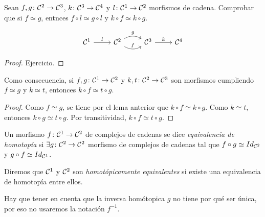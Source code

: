 \documentclass[HS.tex]{subfiles}
\begin{document}
\begin{lemma}
Sean $f,g \colon \mathcal{C}^2 \to \mathcal{C}^3$, $k \colon \mathcal{C}^3 \to \mathcal{C}^4$ y $l \colon \mathcal{C}^1 \to \mathcal{C}^2$ morfismos de cadena. Comprobar que si $f \simeq g$, entnces $f \circ l \simeq g \circ l$ y $k \circ f \simeq k \circ g$.

\[
\begin{tikzcd}
\CC^1 \arrow[r,"l"] & \CC^2 \arrow[r,bend right,"f"] \arrow[r,bend left,"g"]& \CC^3 \arrow[r,"k"] & \CC^4
\end{tikzcd}
\]
\end{lemma}
\begin{proof}
Ejercicio.
\end{proof}

\begin{coro}
Como consecuencia, si $f, g \colon \mathcal{C}^1 \to \mathcal{C}^2$ y $k,t \colon \mathcal{C}^2 \to \mathcal{C}^3$ son morfismos cumpliendo $f \simeq g$ y $k \simeq t$, entonces $k \circ f \simeq t \circ g$.
\end{coro}
\begin{proof}
Como $f \simeq g$, se tiene por el lema anterior que $k \circ f \simeq k \circ g$.
Como $k \simeq t$, entonces $k \circ g \simeq t \circ g$.
Por transitividad, $k \circ f \simeq t \circ g$.
\end{proof}

\begin{defi}
Un morfismo $f \colon \mathcal{C}^1 \to \mathcal{C}^2$ de complejos de cadenas se dice \emph{equivalencia de homotopía} si $\exists g \colon \mathcal{C}^2 \to \mathcal{C}^2$ morfismo de complejos de cadenas tal que $f \circ g \simeq Id_{\mathcal{C}^2}$ y $g \circ f \simeq Id_{\mathcal{C}^1}$.

Diremos que $\mathcal{C}^1$ y $\mathcal{C}^2$ son \emph{homotópicamente equivalentes} si existe una equivalencia de homotopía entre ellos.
\end{defi}

Hay que tener en cuenta que la inversa homótopica $g$ no tiene por qué ser única, por eso no usaremos la notación $f^{-1}$.
\end{document}
